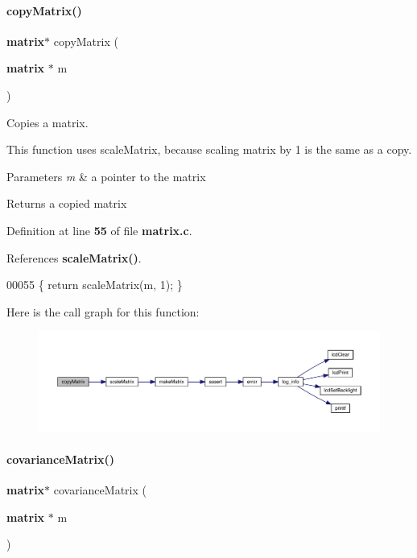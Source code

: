 \paragraph{copy\+Matrix()}
{\footnotesize\ttfamily \textbf{ matrix}$\ast$ copy\+Matrix (\begin{DoxyParamCaption}\item[{\textbf{ matrix} $\ast$}]{m }\end{DoxyParamCaption})}



Copies a matrix. 

This function uses scale\+Matrix, because scaling matrix by 1 is the same as a copy.


\begin{DoxyParams}{Parameters}
{\em m} & a pointer to the matrix \\
\hline
\end{DoxyParams}
\begin{DoxyReturn}{Returns}
a copied matrix 
\end{DoxyReturn}


Definition at line \textbf{ 55} of file \textbf{ matrix.\+c}.



References \textbf{ scale\+Matrix()}.


\begin{DoxyCode}
00055 \{ \textcolor{keywordflow}{return} scaleMatrix(m, 1); \}
\end{DoxyCode}
Here is the call graph for this function\+:
\nopagebreak
\begin{figure}[H]
\begin{center}
\leavevmode
\includegraphics[width=350pt]{matrix_8c_abbb8d2d20c2dd53a2269d017a336668f_cgraph}
\end{center}
\end{figure}
\mbox{\label{matrix_8c_ae6dab569959c360cf165136a3b625edd}} 
\paragraph{covariance\+Matrix()}
{\footnotesize\ttfamily \textbf{ matrix}$\ast$ covariance\+Matrix (\begin{DoxyParamCaption}\item[{\textbf{ matrix} $\ast$}]{m }\end{DoxyParamCaption})}



